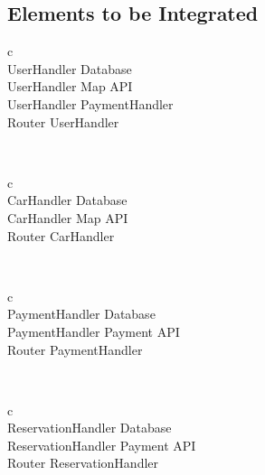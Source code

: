 \subsection{Elements to be Integrated}
    \begin{tabular}{ c }
      \hline
       \\
      \hline
      UserHandler \rightarrow Database \\ \hline
      UserHandler \rightarrow Map API \\ \hline
      UserHandler \rightarrow PaymentHandler \\ \hline
      Router \rightarrow UserHandler \\
      \hline
      \vspace{1mm}
    \end{tabular}
    \\
    \begin{tabular}{ c }
      \hline
       \\
      \hline
      CarHandler \rightarrow Database \\ \hline
      CarHandler \rightarrow Map API \\ \hline
      Router \rightarrow CarHandler \\
      \hline
      \vspace{1mm}
    \end{tabular}
    \\
    \begin{tabular}{ c }
      \hline
       \\
      \hline
      PaymentHandler \rightarrow Database \\ \hline
      PaymentHandler \rightarrow Payment API \\ \hline
      Router \rightarrow PaymentHandler \\
      \hline
      \vspace{1mm}
    \end{tabular}
    \\
    \begin{tabular}{ c }
      \hline
       \\
      \hline
      ReservationHandler \rightarrow Database \\ \hline
      ReservationHandler \rightarrow Payment API \\ \hline
      Router \rightarrow ReservationHandler \\
      \hline
      \vspace{1mm}
    \end{tabular}
